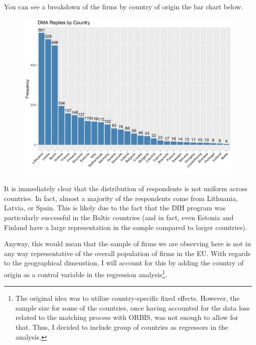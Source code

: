 \documentclass[12pt]{report}
\begin{document}
\par You can see a breakdown of the firms by country of origin the bar chart below. 


\begin{figure}[h!]
    \centering
    \includegraphics[width=\linewidth]{../Output/dma_country_distr_col.png}
    \caption{}
    \label{fig:dma_bycountry}
\end{figure}

\par It is immediately clear that the distribution of respondents is not uniform across countries. In fact, almost a majority of the respondents come from Lithuania, Latvia, or Spain. This is likely due to the fact that the DIH program was particularly successful in the Baltic countries (and in fact, even Estonia and Finland have a large representation in the sample compared to larger countries). 

\par Anyway, this would mean that the sample of firms we are observing here is not in any way representative of the overall population of firms in the EU. With regards to the geographical dimenstion, I will account for this by adding the country of origin as a control variable in the regression analysis\footnote{The original idea was to utilize country-specific fixed effects. However, the sample size for some of the countries, once having accounted for the data loss related to the matching process with ORBIS, was not enough to allow for that. Thus, I decided to include group of countries as regressors in the analysis.}.
\end{document}
